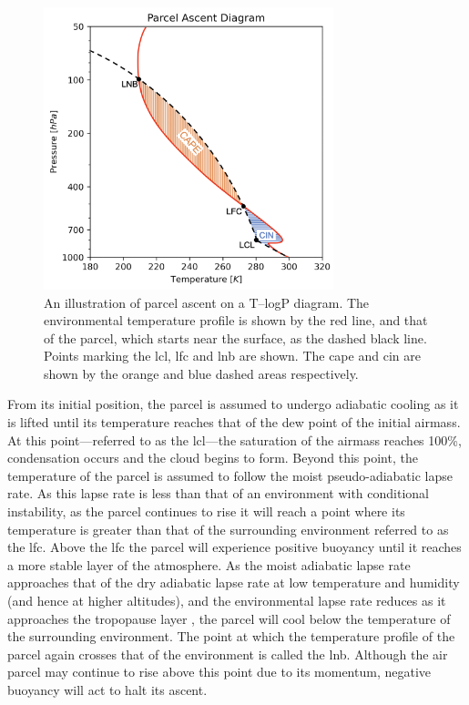 \begin{figure}[tp]
    \centering
    \includegraphics[width=0.75\textwidth]{figures/Intro_parcel_ascent.png}
    \caption[
    An illustration of parcel ascent on a T--logP diagram
    ]{
    An illustration of parcel ascent on a T--logP diagram. The environmental temperature profile is shown by the red line, and that of the parcel, which starts near the surface, as the dashed black line. Points marking the \acrshort{lcl}, \acrshort{lfc} and \acrshort{lnb} are shown. The \acrshort{cape} and \acrshort{cin} are shown by the orange and blue dashed areas respectively.
    }
    \label{fig:parcel_ascent}
\end{figure}

From its initial position, the parcel is assumed to undergo adiabatic cooling as it is lifted until its temperature reaches that of the dew point of the initial airmass. 
At this point---referred to as the \acrshort{lcl}---the saturation of the airmass reaches 100\%, condensation occurs and the cloud begins to form. 
Beyond this point, the temperature of the parcel is assumed to follow the moist pseudo-adiabatic lapse rate. 
As this lapse rate is less than that of an environment with conditional instability, as the parcel continues to rise it will reach a point where its temperature is greater than that of the surrounding environment referred to as the \acrshort{lfc}. 
Above the \acrshort{lfc} the parcel will experience positive buoyancy until it reaches a more stable layer of the atmosphere. 
As the moist adiabatic lapse rate approaches that of the dry adiabatic lapse rate at low temperature and humidity (and hence at higher altitudes), and the environmental lapse rate reduces as it approaches the tropopause layer \citep{fueglistaler_tropical_2009}, the parcel will cool below the temperature of the surrounding environment. 
The point at which the temperature profile of the parcel again crosses that of the environment is called the \acrfull{lnb}. 
Although the air parcel may continue to rise above this point due to its momentum, negative buoyancy will act to halt its ascent.

